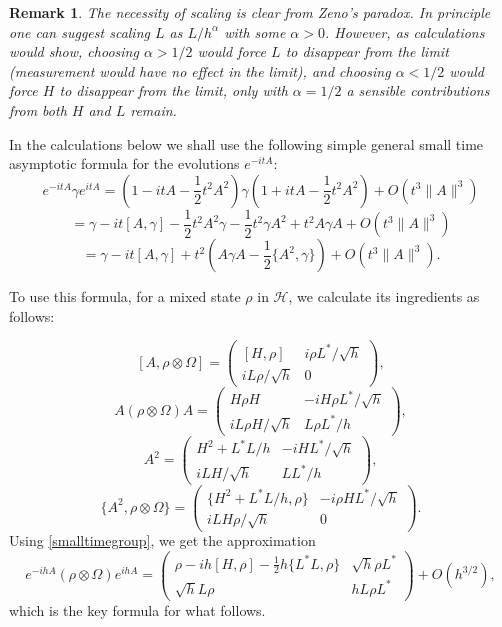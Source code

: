 \documentclass[10pt,a4paper]{amsart}
\def\HC{\mathcal{H}}
\def\al{\alpha}
\def\ga{\gamma}
\newtheorem{remark}{Remark}
\newcommand{\Om}{\Omega}
\begin{document}
 \begin{remark}
 The necessity of scaling is clear from Zeno's paradox. In principle one can suggest
 scaling $L$ as $L/h^{\al}$ with some $\al>0$. However, as calculations would show, choosing $\al>1/2$ would force $L$
 to disappear from the limit (measurement would have no effect in the limit), and choosing $\al<1/2$
 would force $H$ to disappear from the limit,
  only with $\al=1/2$ a sensible contributions from both $H$ and $L$ remain.
 \end{remark}


In the calculations below we shall use the following simple general small time asymptotic
formula for the evolutions $e^{-itA}$:
\[
e^{-itA}\ga e^{itA}
=(1-it A -\frac12 t^2 A^2)\ga (1+it A-\frac12 t^2 A^2)+O(t^3 \|A\|^3)
\]
\[
=\ga-it [A,\ga]-\frac12 t^2 A^2\ga -\frac12 t^2 \ga A^2+t^2 A\ga A+O(t^3 \|A\|^3)
\]
\begin{equation}
\label{smalltimegroup}
=\ga-it [A,\ga]+t^2 (A\ga A-\frac12 \{A^2,\ga\})+O(t^3\|A\|^3).
\end{equation}

To use this formula, for a mixed state $\rho$ in $\HC$, we calculate its ingredients as follows:

\[
\left[A, \rho \otimes \Om \right]
=\begin{pmatrix} [H,\rho] & i\rho L^*/\sqrt h \\ iL\rho/\sqrt h & 0 \end{pmatrix},
\]
\[
A (\rho \otimes \Om) A
=\begin{pmatrix} H\rho H & -i H\rho L^*/\sqrt h\\ iL\rho H/\sqrt h & L\rho L^*/h \end{pmatrix},
\]
\[
A^2 =\begin{pmatrix} H^2+L^*L/h & -iH L^* /\sqrt h \\ iL H/\sqrt h & LL^*/h \end{pmatrix},
\]
\[
\{A^2, \rho \otimes \Om\}=\begin{pmatrix} \{H^2+L^*L/h,\rho\} & -i\rho H L^*/\sqrt h \\ iL H \rho/\sqrt h  & 0 \end{pmatrix}.
\]
Using \eqref{smalltimegroup},
we get the approximation
\begin{equation}
\label{eqdressedrho1}
e^{-ihA} (\rho\otimes \Om) e^{ihA}
=\begin{pmatrix} \rho -ih[H, \rho] -\frac12 h\{L^*L,\rho\} &  \sqrt h \rho L^* \\ \sqrt h L\rho & hL\rho L^* \end{pmatrix}
+O(h^{3/2}),
\end{equation}
which is the key formula for what follows.
\end{document}

